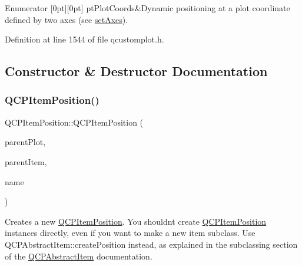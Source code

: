 \begin{DoxyEnumFields}{Enumerator}
[0pt][0pt]{}\mbox{\label{class_q_c_p_item_position_aad9936c22bf43e3d358552f6e86dbdc8ad5ffb8dc99ad73263f7010c77342294c}} 
pt\+Plot\+Coords&Dynamic positioning at a plot coordinate defined by two axes (see \hyperlink{class_q_c_p_item_position_a2185f45c75ac8cb9be89daeaaad50e37}{set\+Axes}). \\
\hline

\end{DoxyEnumFields}


Definition at line 1544 of file qcustomplot.\+h.



\subsection{Constructor \& Destructor Documentation}
\mbox{\label{class_q_c_p_item_position_a3efc524f37fdcd22907545eb77555ce4}} 
\subsubsection{\texorpdfstring{Q\+C\+P\+Item\+Position()}{QCPItemPosition()}}
{\footnotesize\ttfamily Q\+C\+P\+Item\+Position\+::\+Q\+C\+P\+Item\+Position (\begin{DoxyParamCaption}\item[{\hyperlink{class_q_custom_plot}{Q\+Custom\+Plot} $\ast$}]{parent\+Plot,  }\item[{\hyperlink{class_q_c_p_abstract_item}{Q\+C\+P\+Abstract\+Item} $\ast$}]{parent\+Item,  }\item[{const Q\+String}]{name }\end{DoxyParamCaption})}

Creates a new \hyperlink{class_q_c_p_item_position}{Q\+C\+P\+Item\+Position}. You shouldn\textquotesingle{}t create \hyperlink{class_q_c_p_item_position}{Q\+C\+P\+Item\+Position} instances directly, even if you want to make a new item subclass. Use Q\+C\+P\+Abstract\+Item\+::create\+Position instead, as explained in the subclassing section of the \hyperlink{class_q_c_p_abstract_item}{Q\+C\+P\+Abstract\+Item} documentation. 

